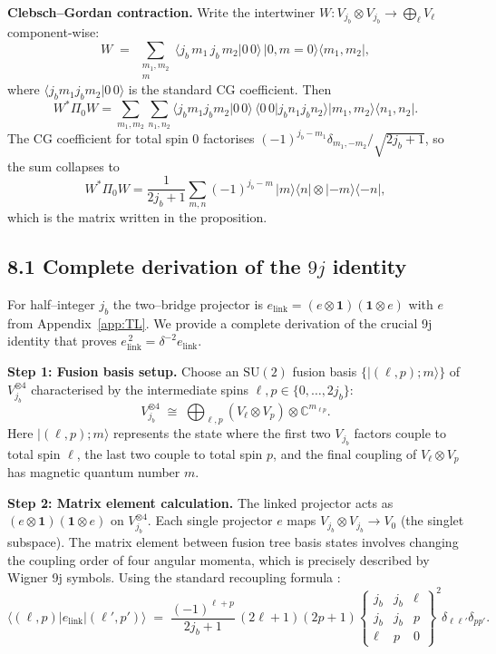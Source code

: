 \documentclass[11pt]{article}
\begin{document}
\medskip
\noindent\textbf{Clebsch–Gordan contraction.}
Write the intertwiner $W\!:V_{j_b}\!\otimes\!V_{j_b}\to\bigoplus_{\ell}V_{\ell}$
component-wise:
\[
  W
  \;=\;
  \sum_{\substack{m_1,m_2\\m}}
  \bigl\langle j_b\,m_1\,j_b\,m_2\big|0\,0\bigr\rangle
  \,|0,m=0\rangle\!\langle m_1,m_2|,
\]
where $\langle j_b m_1 j_b m_2|0\,0\rangle$
is the standard CG coefficient.
Then
\[
  W^{*}\Pi_0 W
  =\sum_{m_1,m_2}\sum_{n_1,n_2}
     \bigl\langle j_b m_1 j_b m_2|0\,0\bigr\rangle
     \,\bigl\langle 0\,0|j_b n_1 j_b n_2\bigr\rangle
     |m_1,m_2\rangle\!\langle n_1,n_2|.
\]
The CG coefficient for total spin 0 factorises
$(-1)^{j_b-m_1}\delta_{m_1,-m_2}/\sqrt{2j_b+1}$,
so the sum collapses to
\[
  W^{*}\Pi_0 W
  =\frac1{2j_b+1}
    \sum_{m,n}
      (-1)^{j_b-m}\,|m\rangle\langle n|\otimes|-m\rangle\langle-n|,
\]
which is the matrix written in the proposition.


\subsection*{8.1  Complete derivation of the $9j$ identity}

For half–integer $j_b$ the two–bridge projector is
$e_{\text{link}} =(e\!\otimes\!\mathbf 1)(\mathbf 1\!\otimes\!e)$ with
$e$ from Appendix~\ref{app:TL}. We provide a complete derivation of the 
crucial 9j identity that proves $e_{\text{link}}^{\,2}=\delta^{-2}e_{\text{link}}$.

\textbf{Step 1: Fusion basis setup.}
Choose an $\mathrm{SU}(2)$ fusion basis
$\{|(\ell,p);m\rangle\}$ of
$V_{j_b}^{\otimes4}$ characterised by the intermediate spins
$\ell,p\in\{0,\dots,2j_b\}$:
\[
  V_{j_b}^{\otimes4}
  \;\cong\;
  \bigoplus_{\ell,p}(V_{\ell}\otimes V_{p})\otimes\mathbb C^{m_{\ell p}}.
\]
Here $|(\ell,p);m\rangle$ represents the state where the first two $V_{j_b}$ 
factors couple to total spin $\ell$, the last two couple to total spin $p$, 
and the final coupling of $V_\ell \otimes V_p$ has magnetic quantum number $m$.

\textbf{Step 2: Matrix element calculation.}
The linked projector acts as $(e\otimes\mathbf{1})(\mathbf{1}\otimes e)$ on $V_{j_b}^{\otimes 4}$.
Each single projector $e$ maps $V_{j_b}\otimes V_{j_b} \to V_0$ (the singlet subspace).
The matrix element between fusion tree basis states involves changing the coupling 
order of four angular momenta, which is precisely described by Wigner 9j symbols.
Using the standard recoupling formula \cite[Eq.\,(3.9)]{Varshalovich1988}:
\[
  \langle(\ell,p)|e_{\text{link}}|(\ell',p')\rangle
  \;=\;
  \frac{(-1)^{\ell+p}}{2j_b+1}
  \,(2\ell+1)(2p+1)
  \begin{Bmatrix}
     j_b & j_b & \ell\\
     j_b & j_b & p\\
     \ell & p & 0
  \end{Bmatrix}^2
  \delta_{\ell\ell'}\delta_{pp'}.
\]
\end{document}

